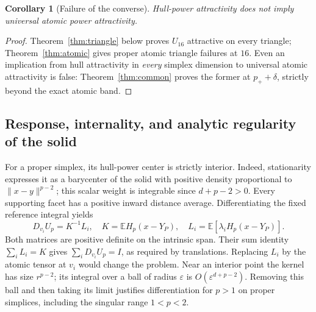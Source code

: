 \documentclass[11pt]{article}
\newtheorem{corollary}[theorem]{Corollary}
\theoremstyle{definition}
\newcommand{\E}{\mathbb E}
\newcommand{\pp}{p_{+}}
\begin{document}
\begin{corollary}[Failure of the converse]
Hull-power attractivity does not imply universal atomic power attractivity.
\end{corollary}
\begin{proof}
Theorem~\ref{thm:triangle} below proves $U_{16}$ attractive on every triangle;
Theorem~\ref{thm:atomic} gives proper atomic triangle failures at $16$.
Even an implication from hull attractivity in \emph{every} simplex dimension
to universal atomic attractivity is false: Theorem~\ref{thm:common} proves
the former at $\pp+\delta$, strictly beyond the exact atomic band.
\end{proof}

\subsection{Response, internality, and analytic regularity of the solid}
For a proper simplex, its hull-power center is strictly interior. Indeed,
stationarity expresses it as a barycenter of the solid with positive
density proportional to $\|x-y\|^{p-2}$; this scalar weight is integrable
since $d+p-2>0$. Every supporting facet has a positive inward distance
average. Differentiating the fixed reference integral yields
\begin{equation}\label{eq:hullresponse}
 D_{v_i}U_p=K^{-1}L_i,\quad
 K=\E H_p(x-Y_P),\quad L_i=\E[\lambda_iH_p(x-Y_P)].
\end{equation}
Both matrices are positive definite on the intrinsic span. Their sum identity
$\sum_iL_i=K$ gives $\sum_iD_{v_i}U_p=I$, as required by translations.
Replacing $L_i$ by the atomic tensor at $v_i$ would change the problem.
Near an interior point the kernel has size $r^{p-2}$; its integral over a
ball of radius $\varepsilon$ is $O(\varepsilon^{d+p-2})$. Removing this
ball and then taking its limit justifies differentiation for $p>1$ on
proper simplices, including the singular range $1<p<2$.
\end{document}
